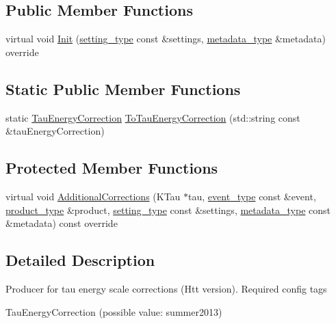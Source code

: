 \subsection*{Public Member Functions}
\begin{DoxyCompactItemize}
\item 
virtual void \hyperlink{classHttTauCorrectionsProducer_ad331a4f917c0e86447c5ee80871a082d}{Init} (\hyperlink{classHttTauCorrectionsProducer_a710b2e9a72d130b031cafe041a85ea38}{setting\_\-type} const \&settings, \hyperlink{classHttTauCorrectionsProducer_ae29469055ab934186c32520cefd75bb5}{metadata\_\-type} \&metadata) override
\end{DoxyCompactItemize}
\subsection*{Static Public Member Functions}
\begin{DoxyCompactItemize}
\item 
static \hyperlink{classHttTauCorrectionsProducer_acc717e96c2a4615a19cad294596fb2f8}{TauEnergyCorrection} \hyperlink{classHttTauCorrectionsProducer_aa38eb3feab13858436018db4360f7be4}{ToTauEnergyCorrection} (std::string const \&tauEnergyCorrection)
\end{DoxyCompactItemize}
\subsection*{Protected Member Functions}
\begin{DoxyCompactItemize}
\item 
virtual void \hyperlink{classHttTauCorrectionsProducer_a8b1827912c40c7a6b0f4853b53419df2}{AdditionalCorrections} (KTau $\ast$tau, \hyperlink{classHttTauCorrectionsProducer_a5f98d673ed860926fc2f057a600839bc}{event\_\-type} const \&event, \hyperlink{classHttTauCorrectionsProducer_abc73e85eb18f55e8bee20a8c65c90cdc}{product\_\-type} \&product, \hyperlink{classHttTauCorrectionsProducer_a710b2e9a72d130b031cafe041a85ea38}{setting\_\-type} const \&settings, \hyperlink{classHttTauCorrectionsProducer_ae29469055ab934186c32520cefd75bb5}{metadata\_\-type} const \&metadata) const override
\end{DoxyCompactItemize}


\subsection{Detailed Description}
Producer for tau energy scale corrections (Htt version). Required config tags
\begin{DoxyItemize}
\item TauEnergyCorrection (possible value: summer2013) 
\end{DoxyItemize}

